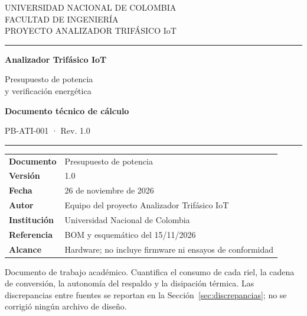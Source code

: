 \documentclass[11pt,a4paper]{article}
\begin{document}
\begin{titlepage}
\thispagestyle{empty}
\begin{flushleft}
{\sffamily\small\color{unalgray}UNIVERSIDAD NACIONAL DE COLOMBIA}\\[2pt]
{\sffamily\small\color{unalgray}FACULTAD DE INGENIERÍA}\\[2pt]
{\sffamily\small\color{unalgray}PROYECTO ANALIZADOR TRIFÁSICO IoT}
\end{flushleft}

\vspace{1.1cm}
{\color{unalblue}\rule{\textwidth}{2.5pt}}
\vspace{0.9cm}

{\sffamily\Huge\bfseries\color{unalblue} Analizador Trifásico IoT\par}
\vspace{0.55cm}
{\sffamily\LARGE Presupuesto de potencia\\[2pt] y verificación energética\par}
\vspace{0.9cm}
{\sffamily\large\bfseries Documento técnico de cálculo\par}
{\sffamily\large PB-ATI-001 · Rev. 1.0\par}
\vspace{0.35cm}
{\color{unalblue}\rule{\textwidth}{0.8pt}}

\vfill

\begin{tabularx}{\textwidth}{@{}>{\bfseries}p{4.3cm}X@{}}
Documento & Presupuesto de potencia \\
Versión & 1.0 \\
Fecha & 26 de noviembre de 2026 \\
Autor & Equipo del proyecto Analizador Trifásico IoT \\
Institución & Universidad Nacional de Colombia \\
Referencia & BOM y esquemático del 15/11/2026 \\
Alcance & Hardware; no incluye firmware ni ensayos de conformidad \\
\end{tabularx}

\vspace{0.9cm}
{\footnotesize\color{unalgray}
Documento de trabajo académico. Cuantifica el consumo de cada riel, la cadena de
conversión, la autonomía del respaldo y la disipación térmica. Las discrepancias
entre fuentes se reportan en la Sección~\ref{sec:discrepancias}; no se corrigió
ningún archivo de diseño.}
\end{titlepage}
\end{document}
